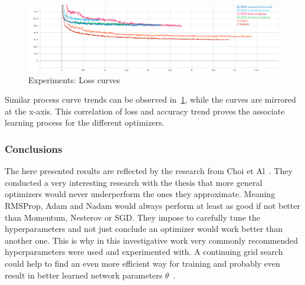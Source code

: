 




\begin{figure}[H]
    \centering
    \includegraphics[width=\textwidth,height=\textheight,keepaspectratio]{img/loss_all.png}
    \decoRule
    \caption[Experiments: Loss curves]{Experiments: Loss curves}
    \label{fig:loss}
\end{figure}
Similar process curve trends can be observed in~\ref{fig:loss}, while the curves are mirrored at the x-axis.
This correlation of loss and accuracy trend proves the associate learning process for the different optimizers.


\subsubsection{Conclusions}
The here presented results are reflected by the research from Choi et Al~\cite{empiricaloptimizers}.
They conducted a very interesting research with the thesis that more general optimizers would never underperform
the ones they approximate.
Meaning \gls{RMSProp}, \gls{Adam} and \gls{Nadam} would always perform at least as good if not better than Momentum, Nesterov or \gls{SGD}.
They impose to carefully tune the hyperparameters and not just conclude an optimizer would work better than another one.
This is why in this investigative work very commonly recommended hyperparameters were used and experimented with.
A continuing grid search could help to find an even more efficient way for training and probably even result in better
learned network parameters $\theta$~\cite{gridsearch}.



